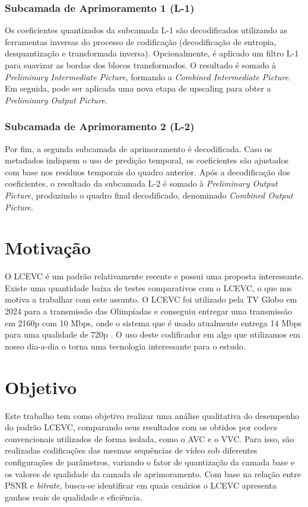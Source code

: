 \subsubsection{Subcamada de Aprimoramento 1 (L-1)}

Os coeficientes quantizados da subcamada \cite{overview_lcevc}L-1 são decodificados utilizando as ferramentas inversas do processo 
de codificação (decodificação de entropia, desquantização e transformada inversa). Opcionalmente, é aplicado 
um filtro L-1 para suavizar as bordas dos blocos transformados. O resultado é somado à \textit{Preliminary 
Intermediate Picture}, formando a \textit{Combined Intermediate Picture}. Em seguida, pode ser aplicada uma 
nova etapa de upscaling para obter a \textit{Preliminary Output Picture}. \cite{MPEG2022LCEVC, overview_lcevc}

\subsubsection{Subcamada de Aprimoramento 2 (L-2)}

Por fim, a segunda subcamada de aprimoramento é decodificada. Caso os metadados indiquem o uso de predição
temporal, os coeficientes são ajustados com base nos resíduos temporais do quadro anterior. Após a decodificação 
dos coeficientes, o resultado da subcamada L-2 é somado à \textit{Preliminary Output Picture}, produzindo o quadro 
final decodificado, denominado \textit{Combined Output Picture}. \cite{MPEG2022LCEVC, overview_lcevc}

\section{Motivação}

O \acrshort{LCEVC} é um padrão relativamente recente e possui uma proposta interessante. Existe uma
quantidade baixa de testes comparativos com o \acrshort{LCEVC}, o que nos motiva a trabalhar com
este assunto. O \acrshort{LCEVC} foi utilizado pela TV Globo em 2024 para a transmissão das Olimpíadas
e conseguiu entregar uma transmissão em 2160p com 10 Mbps, onde o sistema que é usado atualmente
entrega 14 Mbps para uma qualidade de 720p \cite{globo_lcevc}. O uso deste codificador em algo que utilizamos 
em nosso dia-a-dia o torna uma tecnologia interessante para o estudo.

\section{Objetivo}

Este trabalho tem como objetivo realizar uma análise qualitativa do desempenho do padrão \acrfull{LCEVC}, comparando 
seus resultados com os obtidos por codecs convencionais utilizados de forma isolada, como o \acrshort{AVC} e o 
\acrshort{VVC}. Para isso, são realizadas codificações das mesmas sequências de vídeo sob diferentes configurações
de parâmetros, variando o fator de quantização da camada base e os valores de qualidade da camada de aprimoramento. 
Com base na relação entre \acrshort{PSNR} e \textit{bitrate}, busca-se identificar em quais cenários o \acrshort{LCEVC}
apresenta ganhos reais de qualidade e eficiência.